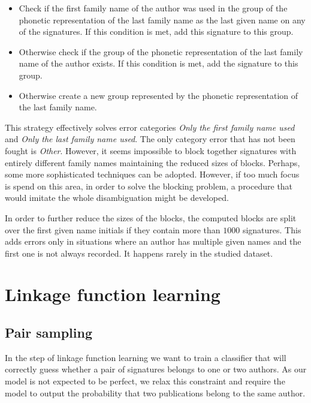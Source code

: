 \documentclass{pracamgr}
\begin{document}
\begin{itemize}
    \item Check if the first family name of the author was used in the group of the
    phonetic representation of the last family name as the last given name on any of the
    signatures. If this condition is met, add this signature to this group.
    \item Otherwise check if the group of the phonetic representation of the last family
    name of the author exists. If this condition is met, add the signature to
    this group.
    \item Otherwise create a new group represented by the phonetic representation
    of the last family name.
\end{itemize}

This strategy effectively solves error categories
\textit{Only the first family name used} and \textit{Only the last family name used}.
The only category error that has not been fought is \textit{Other}. However, it seems
impossible to block together signatures with entirely different family names
maintaining the reduced sizes of blocks. Perhaps, some more sophisticated techniques can be
adopted. However, if too much focus is spend on this area, in order to solve the blocking
problem, a procedure that would imitate the whole disambiguation might be
developed.

In order to further reduce the sizes of the blocks, the computed blocks are split
over the first given name initials if they contain more than $1000$ signatures. This adds errors
only in situations where an author has multiple given names and the first one is not
always recorded. It happens rarely in the studied dataset.

\section{Linkage function learning}

\subsection{Pair sampling}\label{sec:sampling}

In the step of linkage function learning we want to train a classifier that will
correctly guess whether a pair of signatures belongs to one or two authors.
As our model is not expected to be perfect, we relax this constraint and require the model
to output the probability that two publications belong to the same author.
\end{document}
